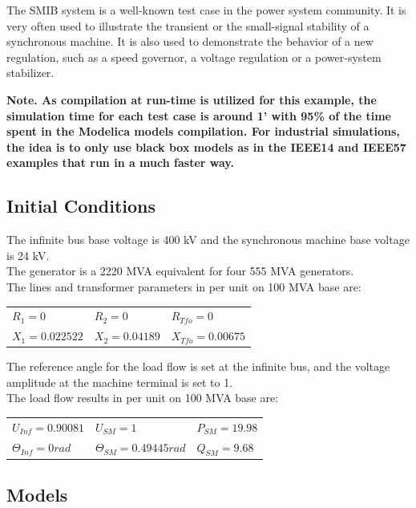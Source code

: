 \documentclass[a4paper, 12pt]{report}
\begin{document}
The SMIB system is a well-known test case in the power system community. It is very often used to illustrate the transient or the small-signal stability of a synchronous machine. It is also used to demonstrate the behavior of a new regulation, such as a speed governor, a voltage regulation or a power-system stabilizer.

\textbf{Note. As compilation at run-time is utilized for this example, the simulation time for each test case is around 1' with 95\% of the time spent in the Modelica models compilation. For industrial simulations, the idea is to only use black box models as in the IEEE14 and IEEE57 examples that run in a much faster way.}

\subsection{Initial Conditions}

The infinite bus base voltage is 400 kV and the synchronous machine base voltage is 24 kV. \\

The generator is a 2220 MVA equivalent for four 555 MVA generators.\\

The lines and transformer parameters in per unit on 100 MVA base are:
\begin{center}
\begin{tabular}{l|l|l}
   $R_1=0$ & $R_2=0$ & $R_{Tfo}=0$ \\
   $X_1=0.022522$ & $X_2=0.04189$ & $X_{Tfo}=0.00675$ \\
\end{tabular}
\end{center}

The reference angle for the load flow is set at the infinite bus, and the voltage amplitude at the machine terminal is set to 1. \\

The load flow results in per unit on 100 MVA base are:
\begin{center}
\begin{tabular}{l|l|l}
   $U_{Inf}=0.90081$ & $U_{SM}=1$ & $P_{SM}=19.98$ \\
   $\Theta_{Inf}=0rad$ & $\Theta_{SM}=0.49445rad$ & $Q_{SM}=9.68$ \\
\end{tabular}
\end{center}

\subsection{Models}
\end{document}
